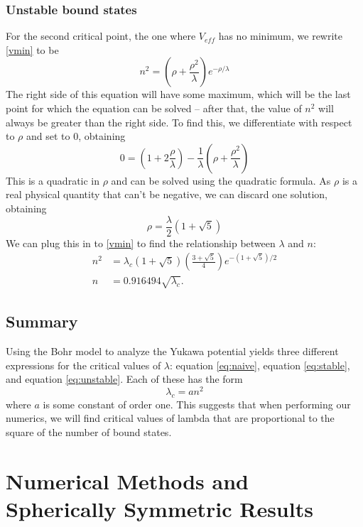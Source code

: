\documentclass[12pt,twoside]{reedthesis}
\newcommand{\eqn}[1]{\begin{equation}#1\end{equation}}
\begin{document}
\subsection{Unstable bound states}
For the second critical point, the one where $V_{eff}$ has no minimum, we rewrite \eqref{vmin} to be
\begin{equation}
n^2 = \left( \rho + \frac{\rho^2}{\lambda} \right) e^{-\rho/\lambda}
\end{equation}
The right side of this equation will have some maximum, which will be the last point for which the equation can be solved -- after that, the value of $n^2$ will always be greater than the right side. To find this, we differentiate with respect to $\rho$ and set to 0, obtaining
\begin{equation}
0 = (1+2 \frac{\rho}{\lambda}) - \frac{1}{\lambda}(\rho + \frac{\rho^2}{\lambda}) 
\end{equation}
This is a quadratic in $\rho$ and can be solved using the quadratic formula.
As $\rho$ is a real physical quantity that can't be negative, we can discard one solution, obtaining
\begin{equation}
\rho = \frac{\lambda}{2}(1+\sqrt{5})
\end{equation}
We can plug this in to \eqref{vmin} to find the relationship between $\lambda$ and $n$:
\begin{align}
n^2 &= \lambda_c(1+\sqrt{5})\left(\frac{3+\sqrt{5}}{4}\right)e^{-(1+\sqrt{5})/2} \\
n &= 0.916494 \sqrt{\lambda_c} \mbox{.}
\label{eq:unstable}
\end{align}
\section{Summary}
Using the Bohr model to analyze the Yukawa potential yields three different expressions for the critical values of $\lambda$: equation \eqref{eq:naive}, equation \eqref{eq:stable}, and equation \eqref{eq:unstable}. Each of these has the form 
\eqn{
\lambda_c = a n^2
}
where $a$ is some constant of order one. This suggests that when performing our numerics, we will find critical values of lambda that are proportional to the square of the number of bound states. 

\clearpage %

\chapter{Numerical Methods and Spherically Symmetric Results}
\end{document}
